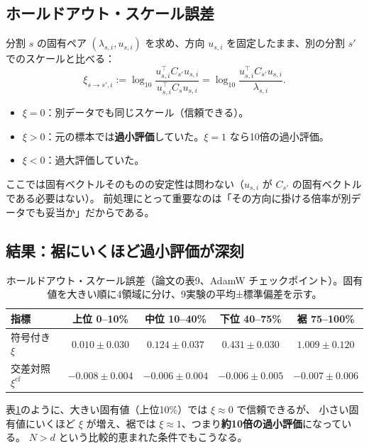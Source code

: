 \documentclass[a4paper,11pt]{ltjsarticle}
\theoremstyle{definition}
\theoremstyle{plain}
\newcommand{\T}{^{\top}}
\begin{document}
\subsection{ホールドアウト・スケール誤差}

分割 $s$ の固有ペア $(\lambda_{s,i}, u_{s,i})$ を求め、方向 $u_{s,i}$ を固定したまま、別の分割 $s'$ でのスケールと比べる：
\begin{equation}\label{eq:xi}
  \xi_{s\to s',i} := \log_{10}\frac{u_{s,i}\T C_{s'}u_{s,i}}{u_{s,i}\T C_s u_{s,i}} = \log_{10}\frac{u_{s,i}\T C_{s'}u_{s,i}}{\lambda_{s,i}} .
\end{equation}
\begin{itemize}
  \item $\xi = 0$：別データでも同じスケール（信頼できる）。
  \item $\xi > 0$：元の標本では\textbf{過小評価}していた。$\xi = 1$ なら10倍の過小評価。
  \item $\xi < 0$：過大評価していた。
\end{itemize}
ここでは固有ベクトルそのものの安定性は問わない（$u_{s,i}$ が $C_{s'}$ の固有ベクトルである必要はない）。
前処理にとって重要なのは「その方向に掛ける倍率が別データでも妥当か」だからである。

\subsection{結果：裾にいくほど過小評価が深刻}

\begin{table}[t]
\centering
\caption{ホールドアウト・スケール誤差（論文の表9、AdamW チェックポイント）。固有値を大きい順に4領域に分け、9実験の平均±標準偏差を示す。}
\label{tab:reliability}
\begin{tabular}{lcccc}
\toprule
指標 & 上位 0--10\% & 中位 10--40\% & 下位 40--75\% & 裾 75--100\%\\\midrule
符号付き $\xi$ & $0.010\pm0.030$ & $0.124\pm0.037$ & $0.431\pm0.030$ & $1.009\pm0.120$\\
交差対照 $\xi^{\mathrm{cf}}$ & $-0.008\pm0.004$ & $-0.006\pm0.004$ & $-0.006\pm0.005$ & $-0.007\pm0.006$\\
\bottomrule
\end{tabular}
\end{table}

表\ref{tab:reliability}のように、大きい固有値（上位10\%）では $\xi\approx0$ で信頼できるが、
小さい固有値にいくほど $\xi$ が増え、裾では $\xi\approx 1$、つまり\textbf{約10倍の過小評価}になっている。
$N > d$ という比較的恵まれた条件でもこうなる。
\end{document}
